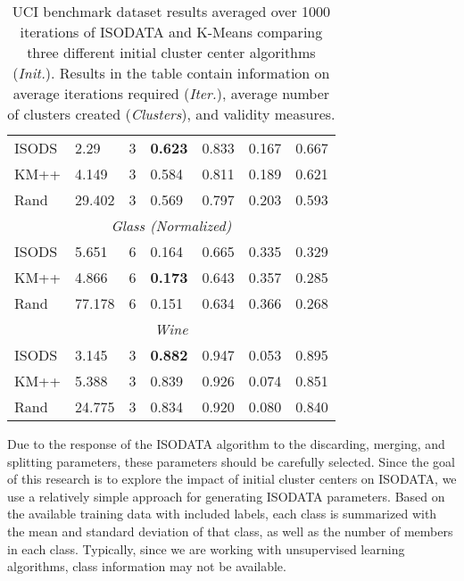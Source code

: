 \documentclass[a4paper,10pt]{article}
\begin{document}
\begin{table}
\begin{tabular}{ |p{1.25cm}||p{1.25cm} p{1.25cm} p{1.25cm} p{1.25cm} p{1.25cm} p{1.25cm}|}
            ISODS & 2.29   & 3        & \textbf{0.623}  & 0.833 & 0.167 & 0.667  \\
            KM++  & 4.149  & 3        & 0.584           & 0.811 & 0.189 & 0.621  \\
            Rand  & 29.402 & 3        & 0.569           & 0.797 & 0.203 & 0.593  \\
            \hline
            \multicolumn{7}{|c|}{\textit{Glass (Normalized)}}                    \\[1ex]
            ISODS & 5.651  & 6        & 0.164           & 0.665 & 0.335 & 0.329  \\
            KM++  & 4.866  & 6        & \textbf{0.173}  & 0.643 & 0.357 & 0.285  \\
            Rand  & 77.178 & 6        & 0.151           & 0.634 & 0.366 & 0.268  \\
            \hline
            \multicolumn{7}{|c|}{\textit{Wine}}                                  \\[1ex]
            ISODS & 3.145  & 3        & \textbf{0.882}  & 0.947 & 0.053 & 0.895  \\
            KM++  & 5.388  & 3        & 0.839           & 0.926 & 0.074 & 0.851  \\
            Rand  & 24.775 & 3        & 0.834           & 0.920 & 0.080 & 0.840  \\
            \hline
      \end{tabular}
      \caption{UCI benchmark dataset results averaged over 1000 iterations of
            ISODATA and K-Means comparing three different initial cluster center
            algorithms (\textit{Init.}). Results in the table contain
            information on average iterations required (\textit{Iter.}), average
            number of clusters created (\textit{Clusters}), and validity
            measures.}
      \label{tab:ucitable}
\end{table}

Due to the response of the ISODATA algorithm to the discarding, merging, and
splitting parameters, these parameters should be carefully selected. Since the
goal of this research is to explore the impact of initial cluster centers on
ISODATA, we use a relatively simple approach for generating ISODATA parameters.
Based on the available training data with included labels, each class is
summarized with the mean and standard deviation of that class, as well as the
number of members in each class. Typically, since we are working with
unsupervised learning algorithms, class information may not be available.
\end{document}
